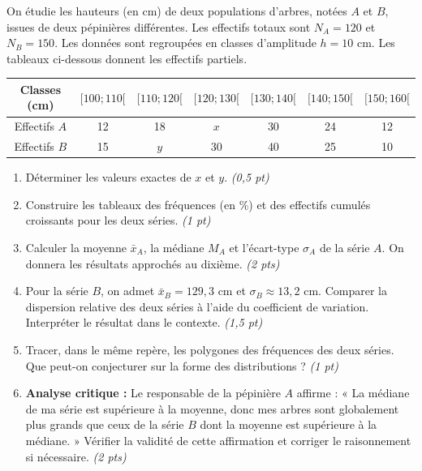 \documentclass[11pt]{article}
\begin{document}
\begin{exercice}
On étudie les hauteurs (en cm) de deux populations d'arbres, notées $A$ et $B$, issues de deux pépinières différentes. Les effectifs totaux sont $N_A = 120$ et $N_B = 150$. Les données sont regroupées en classes d'amplitude $h = 10$ cm. Les tableaux ci-dessous donnent les effectifs partiels.

\begin{center}
\begin{tabular}{|c|c|c|c|c|c|c|}
\hline
Classes (cm) & $[100; 110[$ & $[110; 120[$ & $[120; 130[$ & $[130; 140[$ & $[140; 150[$ & $[150; 160[$ \\ \hline
Effectifs $A$ & 12 & 18 & $x$ & 30 & 24 & 12 \\ \hline
Effectifs $B$ & 15 & $y$ & 30 & 40 & 25 & 10 \\ \hline
\end{tabular}
\end{center}

\begin{enumerate}
    \item Déterminer les valeurs exactes de $x$ et $y$. \textit{(0,5 pt)}
    \item Construire les tableaux des fréquences (en \%) et des effectifs cumulés croissants pour les deux séries. \textit{(1 pt)}
    \item Calculer la moyenne $\bar{x}_A$, la médiane $M_A$ et l'écart-type $\sigma_A$ de la série $A$. On donnera les résultats approchés au dixième. \textit{(2 pts)}
    \item Pour la série $B$, on admet $\bar{x}_B = 129,3$ cm et $\sigma_B \approx 13,2$ cm. Comparer la dispersion relative des deux séries à l'aide du coefficient de variation. Interpréter le résultat dans le contexte. \textit{(1,5 pt)}
    \item Tracer, dans le même repère, les polygones des fréquences des deux séries. Que peut-on conjecturer sur la forme des distributions ? \textit{(1 pt)}
    \item \textbf{Analyse critique :} Le responsable de la pépinière $A$ affirme : « La médiane de ma série est supérieure à la moyenne, donc mes arbres sont globalement plus grands que ceux de la série $B$ dont la moyenne est supérieure à la médiane. » Vérifier la validité de cette affirmation et corriger le raisonnement si nécessaire. \textit{(2 pts)}
\end{enumerate}
\end{exercice}
\end{document}
